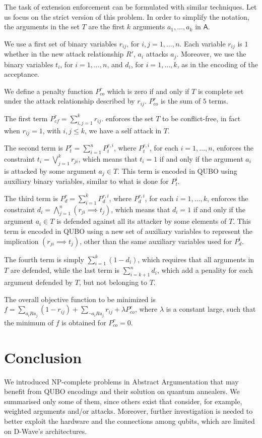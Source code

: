 \documentclass[conference]{IEEEtran}
\newcommand{\args}{\ensuremath{\mathsf{A}}\xspace} %
\newcommand{\atts}{\ensuremath{R}\xspace}
\begin{document}
The task of extension enforcement can be formulated with similar techniques.
Let us focus on the strict version of this problem. 
In order to simplify the notation, the arguments in the set $T$
are the first $k$ arguments $a_1,\dots,a_k$ in $\args$.

We use a first set of binary variables $r_{ij}$, for $i,j=1,\dots,n$.
Each variable $r_{ij}$ is $1$ whether in the new attack relationship 
$R'$, $a_i$ attacks $a_j$. Moreover, we use the binary variables $t_i$,
for $i=1,\dots,n$, and $d_i$, for $i=1,\dots,k$, as in the
encoding of the acceptance.

We define a penalty function $P^r_{co}$ which is zero if and only
if $T$ is complete set under the attack relationship described
by $r_{ij}$. $P^r_{co}$ is the sum of $5$ terms.

The first term 
$P^r_{cf}=\sum_{i,j=1}^k r_{ij}$. 
enforces the set $T$ to be conflict-free, in fact when $r_{ij}=1$,
with $i,j\le k$, we have a self attack in $T$.

The second term is $P^r_t=\sum_{i=1}^n P^{r,i}_{t}$, where 
$P^{r,i}_{t}$, for each $i=1,\dots,n$, enforces the constraint
$t_i=\bigvee_{j=1}^k r_{ji} $, which 
means that $t_i=1$ if and only if the argument $a_i$
is attacked by some argument $a_j\in T$. This term is encoded in QUBO using auxiliary binary variables, similar to what is done for
$P^i_t$.

The third term is $P^r_d=\sum_{i=1}^k P^{r,i}_{d}$, where $P^{r,i}_{d}$, for each $i=1,\dots,k$, enforces the constraint
$d_i=\bigwedge_{j=1}^n (r_{ji} \implies t_j)$,  which 
means that $d_i=1$ if and only if the argument $a_i\in T$
is defended against all its attacker by some elements of $T$.
This term is encoded in QUBO using a new set of auxiliary variables 
to represent the implication $(r_{ji} \implies t_j)$, other
than the same auxiliary variables used for $P^i_d$.

The fourth term is simply $\sum_{i=1}^k (1-d_i)$, which requires
that all arguments in $T$ are defended, while the last term
is $\sum_{i=k+1}^n d_i$, which add a penality for each argument defended by $T$, but not belonging to $T$.

The overall objective function to be minimized is
$f=\sum_{a_i \atts a_j} (1-r_{ij}) + \sum_{\neg a_i \atts a_j} r_{ij} + \lambda P^r_{co}$,
where $\lambda$ is a constant large, such that the minimum of $f$ is 
obtained for $P^r_{co}=0$.



\section{Conclusion}\label{sec:conclusion}
We introduced NP-complete problems in Abstract Argumentation that may benefit from QUBO encodings and their solution on quantum annealers. We summarised only some of them, since others exist  that consider, for example, weighted arguments and/or attacks. Moreover, further investigation is needed to better exploit the hardware and the connections among qubits, which are limited on D-Wave’s architectures.



\end{document}
